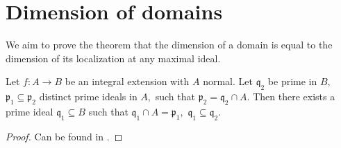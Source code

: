 \section{Dimension of domains}

We aim to prove the theorem that the dimension of a domain is equal to the dimension of its localization at any maximal ideal.

\begin{prop}
  \label{going-down}
  Let \(f \colon A \to B\) be an integral extension with \(A\) normal. Let \(\mathfrak{q}_2\) be prime in \(B,\) \(\mathfrak{p}_1 \subseteq \mathfrak{p}_2\) distinct prime ideals in \(A,\) such that \(\mathfrak{p}_2 = \mathfrak{q}_2 \cap A.\)
  Then there exists a prime ideal \(\mathfrak{q}_1 \subseteq B\) such that
  \(\mathfrak{q}_1 \cap A = \mathfrak{p}_1,\)
  \(\mathfrak{q}_1 \subseteq \mathfrak{q}_2.\)
\end{prop}
\begin{proof}
  Can be found in \cite{atiyah1994introduction}.
\end{proof}

